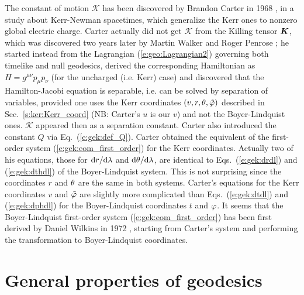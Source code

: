 

\begin{hist}
The constant of motion $\mathscr{K}$ has been discovered by Brandon Carter
in 1968 \cite{Carte68}, in a study about  Kerr-Newman spacetimes,
which generalize the Kerr ones to nonzero global electric charge.
Carter actually did not get $\mathscr{K}$ from the Killing tensor $\bm{K}$,
which was discovered two years later by Martin Walker and
Roger Penrose \cite{WalkeP70}; he
started instead from the Lagrangian (\ref{e:geo:Lagrangian2}) governing
both timelike and null geodesics,
derived the corresponding
Hamiltonian as $H = g^{\mu\nu} p_\mu p_\nu$ (for the uncharged (i.e. Kerr) case)
and discovered that the Hamilton-Jacobi equation
is separable, i.e.
can be solved by separation of variables, provided one uses the
Kerr coordinates
$(v,r,\theta,{\tilde\varphi})$ described in Sec.~\ref{s:ker:Kerr_coord}
(NB: Carter's $u$ is our $v$) and not the Boyer-Lindquist ones.
$\mathscr{K}$ appeared then as a separation constant. Carter also introduced
the constant $Q$ via Eq.~(\ref{e:gek:def_Q}). Carter obtained the equivalent
of the first-order system (\ref{e:gek:eom_first_order}) for the Kerr coordinates. Actually
two of his equations, those for $\mathrm{d} r/\mathrm{d}\lambda$ and $\mathrm{d}\theta/\mathrm{d}\lambda$, are
identical to Eqs.~(\ref{e:gek:drdl}) and (\ref{e:gek:dthdl}) of the Boyer-Lindquist
system. This is not surprising since the coordinates
$r$ and $\theta$ are the same in both systems. Carter's equations for the
Kerr coordinates $v$ and ${\tilde\varphi}$ are slightly more complicated than
Eqs.~(\ref{e:gek:dtdl}) and (\ref{e:gek:dphdl}) for the Boyer-Lindquist coordinates
$t$ and $\varphi$. It seems that the Boyer-Lindquist first-order system (\ref{e:gek:eom_first_order})
has been first derived by Daniel Wilkins in 1972 \cite{Wilki72},
starting from Carter's system and performing the transformation to Boyer-Lindquist
coordinates.
\end{hist}


\section{General properties of geodesics}

